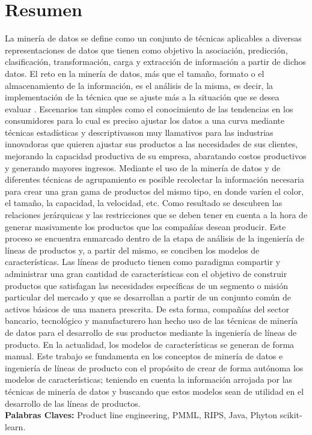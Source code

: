 \chapter{Resumen}

La minería de datos se define como un conjunto de técnicas aplicables a diversas representaciones de datos que tienen como objetivo la asociación, predicción, clasificación, transformación, carga y extracción de información a partir de dichos datos. El reto en la minería de datos, más que el tamaño, formato o el almacenamiento de la información, es el análisis de la misma, es decir, la implementación de la técnica que se ajuste más a la situación que se desea evaluar \cite{Izenman2006}. Escenarios tan simples como el conocimiento de las tendencias en los consumidores \textemdash	para lo cual es preciso ajustar los datos a una curva mediante técnicas estadísticas y descriptivas\textemdash son muy llamativos para las industrias innovadoras que quieren ajustar sus productos a las necesidades de sus clientes, mejorando la capacidad productiva de su empresa, abaratando costos productivos y generando mayores ingresos.
Mediante el uso de la minería de datos y de diferentes técnicas de agrupamiento es posible recolectar la información necesaria para crear una gran gama de productos del mismo tipo, en donde varíen el color, el tamaño, la capacidad, la velocidad, etc. Como resultado se descubren las relaciones jerárquicas y las restricciones que se deben tener en cuenta a la hora de generar masivamente los productos que las compañías desean producir. Este proceso se encuentra enmarcado dentro de la etapa de análisis de la ingeniería de líneas de productos y, a partir del mismo, se conciben los modelos de características. Las líneas de producto tienen como paradigma compartir y administrar una gran cantidad de características con el objetivo de construir productos que satisfagan las necesidades específicas de un segmento o misión particular del mercado y que se desarrollan a partir de un conjunto común de activos básicos de una manera prescrita\cite{Nickel2015}. De esta forma, compañías del sector bancario\cite{Koutanaei2015}, tecnológico \cite{Lin2013} y manufacturero \cite{Bae2011} han hecho uso de las técnicas de minería de datos para el desarrollo de sus productos mediante la ingeniería de líneas de producto. 
En la actualidad, los modelos de características se generan de forma manual. Este trabajo se fundamenta en los conceptos de minería de datos e ingeniería de líneas de producto con el propósito de crear de forma autónoma los modelos de características; teniendo en cuenta la información arrojada por las técnicas de minería de datos y buscando que estos modelos sean de utilidad en el desarrollo de las líneas de productos.
\\
\textbf{Palabras Claves:}
Product line engineering, PMML, RIPS, Java, Phyton scikit-learn. 

